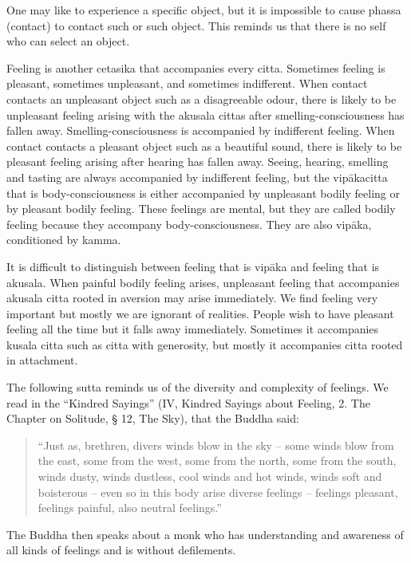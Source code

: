 One may like to experience a specific object, but it is impossible to
cause phassa (contact) to contact such or such object. This reminds us
that there is no self who can select an object.

Feeling is another cetasika that accompanies every citta. Sometimes
feeling is pleasant, sometimes unpleasant, and sometimes indifferent.
When contact contacts an unpleasant object such as a disagreeable odour,
there is likely to be unpleasant feeling arising with the akusala cittas
after smelling-consciousness has fallen away. Smelling-consciousness is
accompanied by indifferent feeling. When contact contacts a pleasant
object such as a beautiful sound, there is likely to be pleasant feeling
arising after hearing has fallen away. Seeing, hearing, smelling and
tasting are always accompanied by indifferent feeling, but the
vipākacitta that is body-consciousness is either accompanied by
unpleasant bodily feeling or by pleasant bodily feeling. These feelings
are mental, but they are called bodily feeling because they accompany
body-consciousness. They are also vipāka, conditioned by kamma.

It is difficult to distinguish between feeling that is vipāka and
feeling that is akusala. When painful bodily feeling arises, unpleasant
feeling that accompanies akusala citta rooted in aversion may arise
immediately. We find feeling very important but mostly we are ignorant
of realities. People wish to have pleasant feeling all the time but it
falls away immediately. Sometimes it accompanies kusala citta such as
citta with generosity, but mostly it accompanies citta rooted in
attachment.

The following sutta reminds us of the diversity and complexity of
feelings. We read in the ``Kindred Sayings'' (IV, Kindred Sayings about
Feeling, 2. The Chapter on Solitude, § 12, The Sky), that the Buddha
said:

\begin{quote}
``Just as, brethren, divers winds blow in the sky -- some winds blow
from the east, some from the west, some from the north, some from the
south, winds dusty, winds dustless, cool winds and hot winds, winds soft
and boisterous -- even so in this body arise diverse feelings --
feelings pleasant, feelings painful, also neutral feelings.''
\end{quote}

The Buddha then speaks about a monk who has understanding and awareness
of all kinds of feelings and is without defilements.

